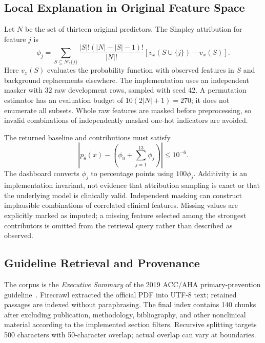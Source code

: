 \documentclass[journal]{IEEEtran}
\begin{document}
\subsection{Local Explanation in Original Feature Space}
Let $N$ be the set of thirteen original predictors. The Shapley attribution for feature $j$ is~\cite{lundberg2017}
\begin{equation}
 \phi_j=\sum_{S\subseteq N\setminus\{j\}}
 \frac{|S|!(|N|-|S|-1)!}{|N|!}
 \left[v_x(S\cup\{j\})-v_x(S)\right].
\end{equation}
Here $v_x(S)$ evaluates the probability function with observed features in $S$ and background replacements elsewhere. The implementation uses an independent masker with 32 raw development rows, sampled with seed 42. A permutation estimator has an evaluation budget of $10(2|N|+1)=270$; it does not enumerate all subsets. Whole raw features are masked before preprocessing, so invalid combinations of independently masked one-hot indicators are avoided.

The returned baseline and contributions must satisfy
\begin{equation}
 \left|p_\theta(x)-\left(\phi_0+\sum_{j=1}^{13}\phi_j\right)\right|
 \leq 10^{-6}.
\end{equation}
The dashboard converts $\phi_j$ to percentage points using $100\phi_j$. Additivity is an implementation invariant, not evidence that attribution sampling is exact or that the underlying model is clinically valid. Independent masking can construct implausible combinations of correlated clinical features. Missing values are explicitly marked as imputed; a missing feature selected among the strongest contributors is omitted from the retrieval query rather than described as observed.

\subsection{Guideline Retrieval and Provenance}
The corpus is the \emph{Executive Summary} of the 2019 ACC/AHA primary-prevention guideline~\cite{arnett2019}. Firecrawl extracted the official PDF into UTF-8 text; retained passages are indexed without paraphrasing. The final index contains 140 chunks after excluding publication, methodology, bibliography, and other nonclinical material according to the implemented section filters. Recursive splitting targets 500 characters with 50-character overlap; actual overlap can vary at boundaries.
\end{document}
